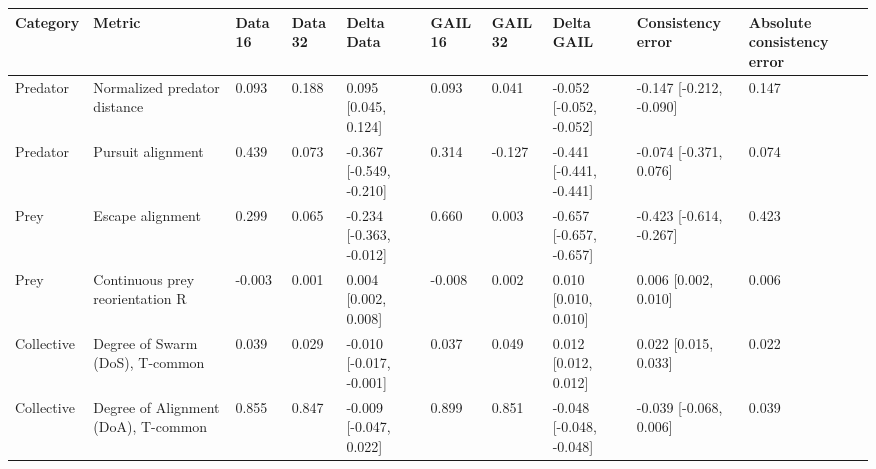 \begin{tabular}{llllllllll}
\toprule
Category & Metric & Data 16 & Data 32 & Delta Data & GAIL 16 & GAIL 32 & Delta GAIL & Consistency error & Absolute consistency error \\
\midrule
Predator & Normalized predator distance & 0.093 & 0.188 & 0.095 [0.045, 0.124] & 0.093 & 0.041 & -0.052 [-0.052, -0.052] & -0.147 [-0.212, -0.090] & 0.147 \\
Predator & Pursuit alignment & 0.439 & 0.073 & -0.367 [-0.549, -0.210] & 0.314 & -0.127 & -0.441 [-0.441, -0.441] & -0.074 [-0.371, 0.076] & 0.074 \\
Prey & Escape alignment & 0.299 & 0.065 & -0.234 [-0.363, -0.012] & 0.660 & 0.003 & -0.657 [-0.657, -0.657] & -0.423 [-0.614, -0.267] & 0.423 \\
Prey & Continuous prey reorientation R & -0.003 & 0.001 & 0.004 [0.002, 0.008] & -0.008 & 0.002 & 0.010 [0.010, 0.010] & 0.006 [0.002, 0.010] & 0.006 \\
Collective & Degree of Swarm (DoS), T-common & 0.039 & 0.029 & -0.010 [-0.017, -0.001] & 0.037 & 0.049 & 0.012 [0.012, 0.012] & 0.022 [0.015, 0.033] & 0.022 \\
Collective & Degree of Alignment (DoA), T-common & 0.855 & 0.847 & -0.009 [-0.047, 0.022] & 0.899 & 0.851 & -0.048 [-0.048, -0.048] & -0.039 [-0.068, 0.006] & 0.039 \\
\bottomrule
\end{tabular}
